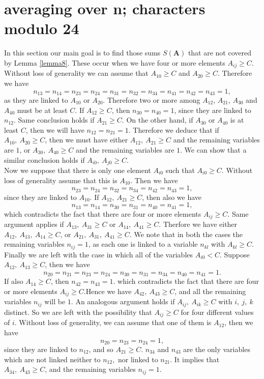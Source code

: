 \documentclass[11pt]{article}
\newcommand{\A}{ \textbf{A} }
\begin{document}
\section{averaging over \textbf{n}; characters modulo 24}
\noindent In this section our main goal is to find those sums $S(\A)$ that are not covered by Lemma \ref{lemma8}. These occur when we have four or more elements $A_{ij}\geq C$. Without loss of generality we can assume that $A_{10}\geq C$ and $A_{20}\geq C$. Therefore we have
$$n_{13}=n_{14}=n_{23}=n_{24}=n_{31}=n_{32}=n_{34}=n_{41}=n_{42}=n_{43}=1,$$
as they are linked to $A_{10}$ or $A_{20}$. Therefore two or more among $A_{12}$, $A_{21}$, $A_{30}$ and $A_{40}$ must be at least $C$. If $A_{12}\geq C$, then $n_{30}=n_{40}=1$, since they are linked to $n_{12}$. Same conclusion holds if $A_{21}\geq C$. On the other hand, if $A_{30}$ or $A_{40}$ is at least $C$, then we will have $n_{12}=n_{21}=1$. Therefore we deduce that if $A_{10},\: A_{20}\geq C$, then we must have either $A_{12},\: A_{21}\geq C$ and the remaining variables are $1$, or $A_{30},\: A_{40}\geq C$ and the remaining variables are $1$. We can show that a similar conclusion holds if $A_{i0},\: A_{j0}\geq C$.\\

\noindent Now we suppose that there is only one element $A_{i0}$ such that $A_{i0}\geq C$. Without loss of generality assume that this is $A_{10}$. Then we have
$$n_{23}=n_{24}=n_{32}=n_{34}=n_{42}=n_{43}=1,$$
since they are linked to $A_{10}$. If $A_{12},\: A_{21}\geq C$, then also we have
$$n_{13}=n_{14}=n_{30}=n_{31}=n_{40}=n_{41}=1,$$
which contradicts the fact that there are four or more elements $A_{ij}\geq C$. Same argument applies if $A_{13},\: A_{31}\geq C$ or $A_{14},\: A_{41}\geq C$. Therfore we  have either $A_{12},\: A_{13},\: A_{14}\geq C$, or $A_{21},\: A_{31},\: A_{41}\geq C$. We note that in both the cases the remaining variables $n_{ij}=1$, as each one is linked to a variable $n_{kl}$ with $A_{kl}\geq C$.\\

\noindent Finally we are left with the case in which all of the variables $A_{i0}<C$. Suppose $A_{12},\: A_{13}\geq C$, then we have
$$n_{20}=n_{21}=n_{23}=n_{24}=n_{30}=n_{31}=n_{34}=n_{40}=n_{41}=1.$$
If also $A_{14}\geq C$, then $n_{42}=n_{43}=1$. which contradicts the fact that there are four or more elements $A_{ij}\geq C$.Hence we have $A_{42},\: A_{43}\geq C$, and all the remaining variables $n_{ij}$ will be $1$. An analogous argument holds if $A_{ij},\: A_{ik}\geq C$ with $i,\:j,\:k$ distinct. So we are left with the possibility that $A_{ij}\geq C$ for four different values of $i$. Without loss of generality, we can assume that one of them is $A_{12}$, then we have
$$n_{20}=n_{23}=n_{24}=1,$$
since they are linked to $n_{12}$, and so $A_{21}\geq C$. $n_{34}$ and $n_{43}$ are the only variables which are not linked  neither  to $n_{12},$ nor linked to $n_{21}$. It implies that $A_{34},\: A_{43}\geq C$, and the remaining variables $n_{ij}=1$.\\
\end{document}
